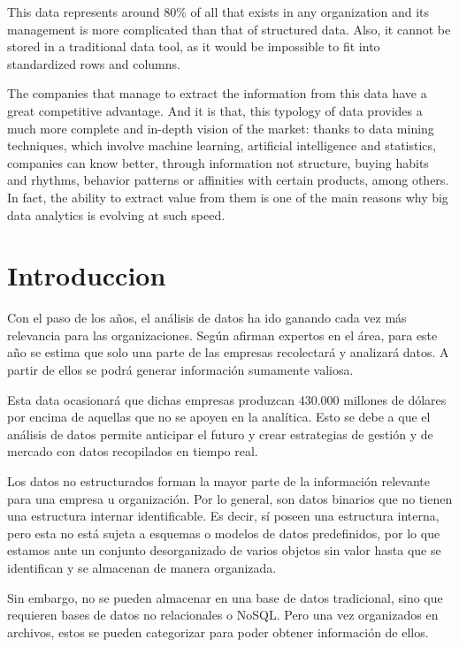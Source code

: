 \documentclass[twoside,twocolumn]{article}
\begin{document}
This data represents around 80\% of all that exists in any organization
 and its management is more complicated than that of structured data.
  Also, it cannot be stored in a traditional data tool, as it would be impossible 
  to fit into standardized rows and columns. 

The companies that manage to extract the information from this data 
have a great competitive advantage. And it is that, this typology of 
data provides a much more complete and in-depth vision of the market: 
thanks to data mining techniques, which involve machine learning, artificial 
intelligence and statistics, companies can know better, through information 
not structure, buying habits and rhythms, behavior patterns or affinities with
 certain products, among others. In fact, the ability to extract value from them is one
 of the main reasons why big data analytics is evolving at such speed. 




\section{Introduccion}

Con el paso de los años, el análisis de datos ha ido ganando cada vez 
más relevancia para las organizaciones. Según afirman expertos en el área,
 para este año se estima que solo una parte de las empresas recolectará y analizará datos.
  A partir de ellos se podrá generar información sumamente valiosa.  

Esta data ocasionará que dichas empresas produzcan 430.000 millones de 
dólares por encima de aquellas que no se apoyen en la analítica. 
 Esto se debe a que el análisis de datos permite anticipar el futuro y 
 crear estrategias de gestión y de mercado con datos recopilados en tiempo real. 

Los datos no estructurados forman la mayor parte de la información 
relevante para una empresa u organización. Por lo general, son datos
 binarios que no tienen una estructura internar identificable. 
 Es decir, sí poseen una estructura interna, pero esta no está sujeta a 
 esquemas o modelos de datos predefinidos, por lo que estamos ante un conjunto
  desorganizado de varios objetos sin valor hasta que se identifican y se almacenan 
  de manera organizada. 

Sin embargo, no se pueden almacenar en una base de datos tradicional, 
sino que requieren bases de datos no relacionales o NoSQL. Pero una vez
 organizados en archivos, estos se pueden categorizar para poder obtener 
 información de ellos. 
\end{document}
